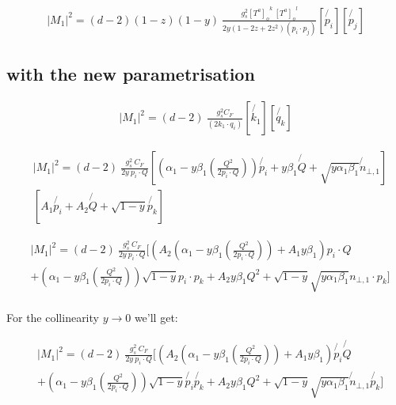 \begin{equation}
\begin{split}
|M_1|^2=(d-2)(1-z)(1-y)\:\frac{g_s^2  {[T^a]_{o}}^k \: {[T^a]_o}^l }{2y(1-2z+2z^2)(p_i \cdot p_j)}
[\not{p_i}][\not{p_j}]
\end{split}
\end{equation}
\pagebreak
\subsection*{with the new parametrisation}

\begin{equation}
\begin{split}
|M_1|^2=(d-2)\:\frac{g_s^2  C_F }{(2k_1\cdot q_i)}
[\not{k_1} ][\not{q_k}]
\end{split}
\end{equation}

\begin{equation}
\begin{split}
&|M_1|^2=(d-2)\:\frac{g_s^2 \: C_F }{2y\: p_i \cdot Q}
[(\alpha_1 -y\beta_1(\frac{Q^2}{2p_i \cdot Q})) \not{p_i} + y\beta_1\not{Q} + \sqrt{y\alpha_1\beta_1}\not{n}_{\bot,1} ]\\
&[A_1\not{p_i} + A_2\not{Q} + \sqrt{1-y}\not{p_k}]
\end{split}
\end{equation}

\begin{equation}
\begin{split}
&|M_1|^2=(d-2)\:\frac{g_s^2 \: C_F }{2y\: p_i \cdot Q}
[(A_2(\alpha_1 -y\beta_1(\frac{Q^2}{2p_i \cdot Q}))+ A_1y\beta_1) {p_i}\cdot Q\\
&+(\alpha_1 -y\beta_1(\frac{Q^2}{2p_i \cdot Q}))\sqrt{1-y}p_i\cdot p_k+A_2 y\beta_1 Q^2+ \sqrt{1-y}\sqrt{y\alpha_1\beta_1}{n}_{\bot,1}\cdot p_k ]\\
\end{split}
\end{equation}

For the collinearity $ y \rightarrow 0 $ we'll get:

\begin{equation}
\begin{split}
&|M_1|^2=(d-2)\:\frac{g_s^2 \: C_F }{2y\: p_i \cdot Q}
[(A_2(\alpha_1 -y\beta_1(\frac{Q^2}{2p_i \cdot Q}))+ A_1y\beta_1) \not{p_i} \not{Q}\\
&+(\alpha_1 -y\beta_1(\frac{Q^2}{2p_i \cdot Q}))\sqrt{1-y}\not{p_i} \not{p_k}+A_2 y\beta_1 Q^2+ \sqrt{1-y}\sqrt{y\alpha_1\beta_1}\not{n}_{\bot,1} \not{p_k} ]\\
\end{split}
\end{equation}

